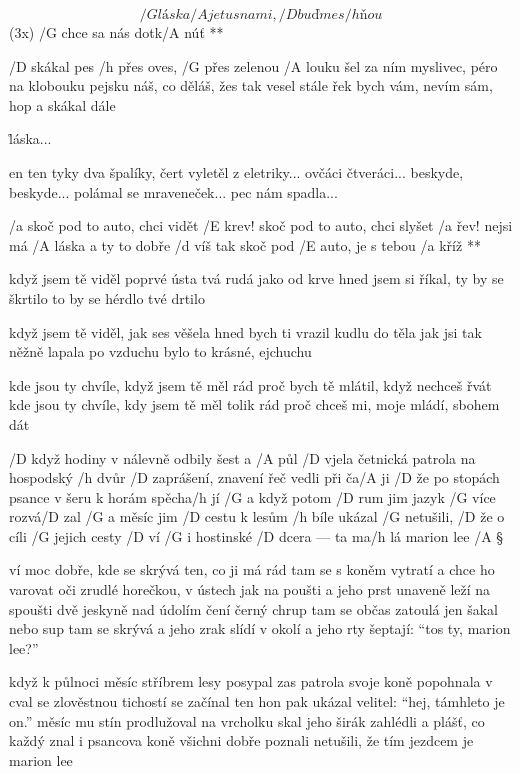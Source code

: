 
\R \[ /G láska /A je tu s nami, /D buďme s /h ňou \] \hfil (3x)
   /G chce sa nás dotk/A núť **

/D skákal pes /h přes oves, /G přes zelenou /A louku
šel za ním myslivec, péro na klobouku
pejsku náš, co děláš, žes tak vesel stále
řek bych vám, nevím sám, hop a skákal dále \s

\r láska...

en ten tyky dva špalíky, čert vyletěl z eletriky...
ovčáci čtveráci...
beskyde, beskyde...
polámal se mraveneček...
pec nám spadla...




\R /a skoč pod to auto, chci vidět /E krev!
   skoč pod to auto, chci slyšet /a řev!
   nejsi má /A láska a ty to dobře /d víš
   tak skoč pod /E auto, je s tebou /a kříž **

když jsem tě viděl poprvé
ústa tvá rudá jako od krve
hned jsem si říkal, ty by se škrtilo
to by se hérdlo tvé drtilo \s

když jsem tě viděl, jak ses věšela
hned bych ti vrazil kudlu do těla
jak jsi tak něžně lapala po vzduchu
bylo to krásné, ejchuchu \s

kde jsou ty chvíle, když jsem tě měl rád
proč bych tě mlátil, když nechceš řvát
kde jsou ty chvíle, kdy jsem tě měl tolik rád
proč chceš mi, moje mládí, sbohem dát



/D když hodiny v nálevně odbily šest a /A půl
/D vjela četnická patrola na hospodský /h dvůr
/D zaprášení, znavení řeč vedli při ča/A ji
/D že po stopách psance v šeru k horám spěcha/h jí
/G a když potom /D rum jim jazyk /G více rozvá/D zal
/G a měsíc jim /D cestu k lesům /h bíle ukázal
/G netušili, /D že o cíli /G jejich cesty /D ví
/G i hostinské /D dcera --- ta ma/h lá marion lee \nic /A \S

ví moc dobře, kde se skrývá ten, co ji má rád
tam se s koněm vytratí a chce ho varovat
oči zrudlé horečkou, v ústech jak na poušti
a jeho prst unaveně leží na spoušti
dvě jeskyně nad údolím čení černý chrup
tam se občas zatoulá jen šakal nebo sup
tam se skrývá a jeho zrak slídí v okolí
a jeho rty šeptají: ``tos ty, marion lee?'' \s

když k půlnoci měsíc stříbrem lesy posypal
zas patrola svoje koně popohnala v cval
se zlověstnou tichostí se začínal ten hon
pak ukázal velitel: ``hej, támhleto je on.''
měsíc mu stín prodlužoval na vrcholku skal
jeho širák zahlédli a plášť, co každý znal
i psancova koně všichni dobře poznali
netušili, že tím jezdcem je marion lee \s

